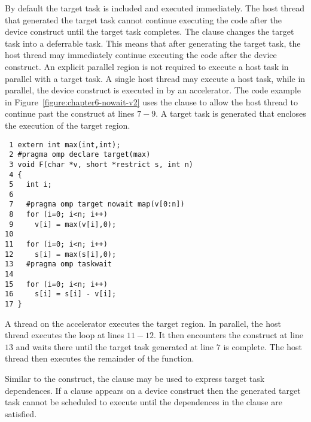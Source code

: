 By default the target task is included and executed immediately.  The host
thread that generated the target task cannot continue executing the code after
the device construct until the target task completes.  The  clause
changes the target task into a deferrable task.  This means that after
generating the target task, the host thread may immediately continue executing
the code after the device construct.  An explicit parallel region is not
required to execute a host task in parallel with a target task.  A single host
thread may execute a host task, while in parallel, the device construct is executed in
by an accelerator.  The code example in
Figure~\ref{figure:chapter6-nowait-v2} uses the  clause to allow the
host thread to continue past the  construct at lines $7-9$.  A
target task is generated that encloses the execution of the target region.

\begin{figure*}[!tb]
\begin{verbatim}
 1 extern int max(int,int);
 2 #pragma omp declare target(max)
 3 void F(char *v, short *restrict s, int n)
 4 {
 5   int i;
 6 
 7   #pragma omp target nowait map(v[0:n])
 8   for (i=0; i<n; i++)
 9     v[i] = max(v[i],0);
10 
11   for (i=0; i<n; i++)
12     s[i] = max(s[i],0);
13   #pragma omp taskwait
14 
15   for (i=0; i<n; i++)
16     s[i] = s[i] - v[i];
17 }
\end{verbatim}
\caption{ \textbf {Example using the nowait clause } -- \small
          Execute the target region on an accelerator in 
          parallel with the code executing on the host.
         }
\label{figure:chapter6-nowait-v2}
\end{figure*}

A thread on the accelerator executes the target region.  In parallel, the host
thread executes the loop at lines $11-12$.  It then encounters the
 construct at line $13$ and waits there until the target task
generated at line $7$ is complete.  The host thread then executes the
remainder of the function.

Similar to the  construct, the  clause may be
used to express target task dependences.  If a  clause appears on
a device construct then the generated target task cannot be scheduled to
execute until the dependences in the clause are satisfied.

